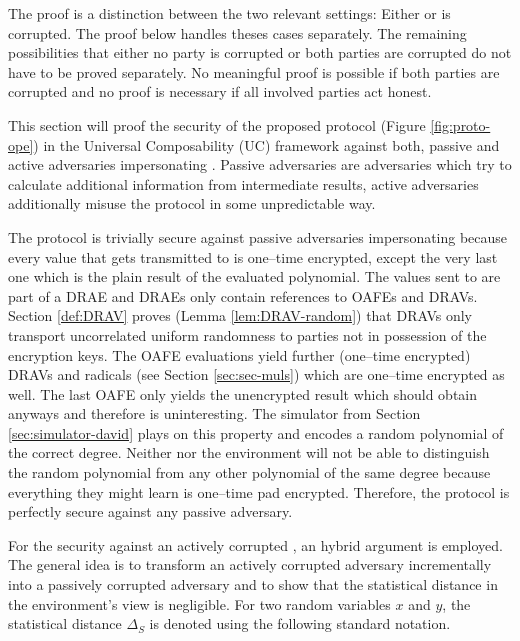 %
%
\label{sec:proof}

The proof is a distinction between the two relevant settings: Either \JWpOne{}
or \JWpTwo{} is corrupted. The proof below handles theses cases separately. The
remaining possibilities that either no party is corrupted or both parties are
corrupted do not have to be proved separately. No meaningful proof is possible
if both parties are corrupted and no proof is necessary if all involved parties
act honest.



This section will proof the security of the proposed protocol \JWprotoSymOPE
(Figure \ref{fig:proto-ope}) in the Universal Composability (UC) framework
\cite{canetti01} against both, passive and active adversaries impersonating
\JWpTwo{}. Passive adversaries are adversaries which try to calculate additional
information from intermediate results, active adversaries additionally misuse
the protocol in some unpredictable way.

The protocol is trivially secure against passive adversaries impersonating
\JWpTwo{} because every value that gets transmitted to \JWpTwo{} is one--time
encrypted, except the very last one which is the plain result of the evaluated
polynomial. The values sent to \JWpTwo{} are part of a DRAE and DRAEs only
contain references to OAFEs and DRAVs. Section \ref{def:DRAV} proves (Lemma
\ref{lem:DRAV-random}) that DRAVs only transport uncorrelated uniform randomness
to parties not in possession of the encryption keys. The OAFE evaluations yield
further (one--time encrypted) DRAVs and radicals (see Section
\ref{sec:sec-muls}) which are one--time encrypted as well. The last OAFE only
yields the unencrypted result which \JWpTwo{} should obtain anyways and
therefore is uninteresting. The simulator from Section \ref{sec:simulator-david}
plays on this property and encodes a random polynomial of the correct degree.
Neither \JWpTwo{} nor the environment will not be able to distinguish the random
polynomial from any other polynomial of the same degree because everything they
might learn is one--time pad encrypted. Therefore, the protocol is perfectly
secure against any passive adversary.

For the security against an actively corrupted \JWpTwo{}, an hybrid argument is
employed. The general idea is to transform an actively corrupted adversary
incrementally into a passively corrupted adversary and to show that the
statistical distance in the environment's view is negligible. For two random
variables $x$ and $y$, the statistical distance $\Delta_S$ is denoted using the
following standard notation.

